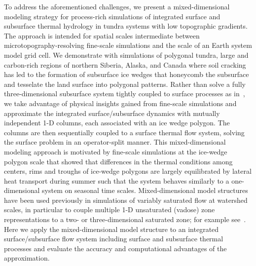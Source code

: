 \documentclass[review,11pt]{elsarticle}
\begin{document}
To address the aforementioned challenges, we present a mixed-dimensional modeling strategy for process-rich simulations of integrated surface and subsurface thermal hydrology in tundra systems with low topographic gradients. The approach is intended for spatial scales intermediate between microtopography-resolving fine-scale simulations and the scale of an Earth system model grid cell. We demonstrate with simulations of polygonal tundra, large and carbon-rich regions of northern Siberia, Alaska, and Canada where soil cracking has led to the formation of subsurface ice wedges that honeycomb the subsurface and tesselate the land surface into polygonal patterns. Rather than solve a fully three-dimensional subsurface system tightly coupled to surface processes as in~\cite{spainter2016integrated}, we take advantage of physical insights gained from fine-scale simulations and approximate the integrated surface/subsurface dynamics with mutually independent 1-D columns, each associated with an ice wedge polygon. The columns are then sequentially coupled to a surface thermal flow system, solving the surface problem in an operator-split manner. This mixed-dimensional modeling approach is motivated by fine-scale simulations at the ice-wedge polygon scale that showed that differences in the thermal conditions among centers, rims and troughs of ice-wedge polygons are largely equilibrated by lateral heat transport during summer such that the system behaves similarly to a one-dimensional system on seasonal time scales. Mixed-dimensional model structures have been used previously in simulations of variably saturated flow at watershed scales, in particular to couple multiple 1-D unsaturated (vadose) zone representations to a two- or three-dimensional saturated zone; for example see~\cite{pikul1974numerical,zhu2011method,hybrid3D}. Here we apply the mixed-dimensional model structure to an integrated surface/subsurface flow system including surface and subsurface thermal processes and evaluate the accuracy and computational advantages of the approximation. 

\end{document}
